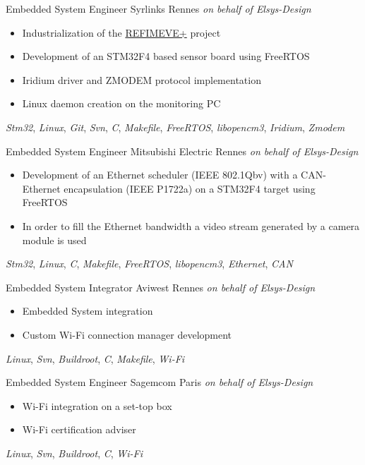 \documentclass[11pt,a4paper,sans]{moderncv}
\begin{document}
	{Embedded System Engineer}
	{Syrlinks}
	{Rennes}
	{\textit{on behalf of Elsys-Design}}
	{
		\begin{itemize}
		\item Industrialization of the
			\href{http://www.refimeve.fr}{REFIMEVE+} project
		\item Development of an STM32F4 based sensor board using FreeRTOS
		\item Iridium driver and ZMODEM protocol implementation
		\item Linux daemon creation on the monitoring PC
		\end{itemize}
		\textit{Stm32},
		\textit{Linux},
		\textit{Git}, \textit{Svn},
		\textit{C}, \textit{Makefile},
		\textit{FreeRTOS}, \textit{libopencm3},
		\textit{Iridium}, \textit{Zmodem}
	}
	{Embedded System Engineer}
	{Mitsubishi Electric}
	{Rennes}
	{\textit{on behalf of Elsys-Design}}
	{
		\begin{itemize}
		\item Development of an Ethernet scheduler (IEEE 802.1Qbv)
			with a CAN-Ethernet encapsulation (IEEE P1722a)
			on a STM32F4 target using FreeRTOS
		\item In order to fill the Ethernet bandwidth a video stream
			generated by a camera module is used
		\end{itemize}
		\textit{Stm32},
		\textit{Linux},
		\textit{C}, \textit{Makefile},
		\textit{FreeRTOS}, \textit{libopencm3},
		\textit{Ethernet}, \textit{CAN}
	}
	{Embedded System Integrator}
	{Aviwest}
	{Rennes}
	{\textit{on behalf of Elsys-Design}}
	{
		\begin{itemize}
		\item Embedded System integration
		\item Custom Wi-Fi connection manager development
		\end{itemize}
		\textit{Linux},
		\textit{Svn},
		\textit{Buildroot},
		\textit{C}, \textit{Makefile},
		\textit{Wi-Fi}
	}
	{Embedded System Engineer}
	{Sagemcom}
	{Paris}
	{\textit{on behalf of Elsys-Design}}
	{
		\begin{itemize}
		\item Wi-Fi integration on a set-top box
		\item Wi-Fi certification adviser
		\end{itemize}
		\textit{Linux},
		\textit{Svn},
		\textit{Buildroot},
		\textit{C},
		\textit{Wi-Fi}
	}
\end{document}
